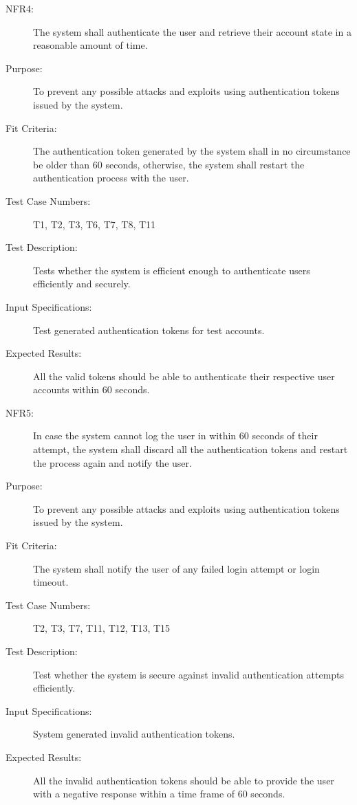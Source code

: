 \documentclass[a4paper,twoside,phd]{BYUPhys}
\begin{document}
\begin{description}
\item[NFR4:] The system shall authenticate the user and retrieve their account state in a reasonable amount of time.
\item[Purpose:] To prevent any possible attacks and exploits using authentication tokens issued by the system.
\item[Fit Criteria:] The authentication token generated by the system shall in no circumstance be older than 60 seconds, otherwise, the system shall restart the authentication process with the user.
\item[Test Case Numbers:] T1, T2, T3, T6, T7, T8, T11
\item[Test Description:] Tests whether the system is efficient enough to authenticate users efficiently and securely.
\item[Input Specifications:] Test generated authentication tokens for test accounts.
\item[Expected Results:] All the valid tokens should be able to authenticate their respective user accounts within 60 seconds.

\item[NFR5:] In case the system cannot log the user in within 60 seconds of their attempt, the system shall discard all the authentication tokens and restart the process again and notify the user.
\item[Purpose:] To prevent any possible attacks and exploits using authentication tokens issued by the system.
\item[Fit Criteria:] The system shall notify the user of any failed login attempt or login timeout.
\item[Test Case Numbers:] T2, T3, T7, T11, T12, T13, T15
\item[Test Description:] Test whether the system is secure against invalid authentication attempts efficiently.
\item[Input Specifications:] System generated invalid authentication tokens. 
\item[Expected Results:] All the invalid authentication tokens should be able to provide the user with a negative response within a time frame of 60 seconds.

\end{description}
\end{document}
